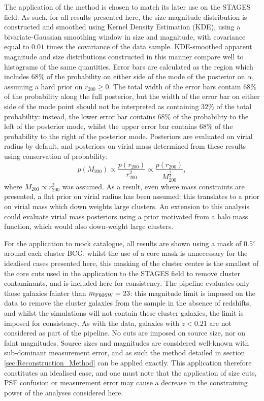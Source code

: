 \documentclass[useAMS,usenatbib,times,letter,amssymb]{mn2e}
\def\be{\begin{equation}}
\def\ee{\end{equation}}
\begin{document}
The application of the method is chosen to match its later use on the STAGES field. As such, for all results presented here, the size-magnitude distribution is constructed and smoothed using Kernel Density Estimation (KDE), using a bivariate-Gaussian smoothing window in size and magnitude, with covariance equal to $0.01$ times the covariance of the data sample. KDE-smoothed apparent magnitude and size distributions constructed in this manner compare well to histograms of the same quantities. Error bars are calculated as the region which includes $68\%$ of the probability on either side of the mode of the posterior on $\alpha$, assuming a hard prior on $r_{200} \ge 0$. The total width of the error bars contain $68\%$ of the probability along the full posterior, but the width of the error bar on either side of the mode point should not be interpreted as containing $32\%$ of the total probability: instead, the lower error bar contains $68\%$ of the probability to the left of the posterior mode, whilst the upper error bar contains $68\%$ of the probability to the right of the posterior mode. Posteriors are evaluated on virial radius by default, and posteriors on virial mass determined from these results using conservation of probability:
\be\label{eqn:Mass_Radius_Prior_equiv}
p(M_{200}) \propto \frac{p(r_{200})}{r_{200}^2} \propto \frac{p(r_{200})}{M_{200}^{\frac{2}{3}}},
\ee
where $M_{200} \propto r_{200}^3$ was assumed. As a result, even where mass constraints are presented, a flat prior on virial radius has been assumed: this translates to a prior on virial mass which down weights large clusters. An extension to this analysis could evaluate virial mass posteriors using a prior motivated from a halo mass function, which would also down-weight large clusters.

For the application to mock catalogue, all results are shown using a mask of $0.5'$ around each cluster BCG: whilst the use of a core mask is unnecessary for the idealised cases presented here, this masking of the cluster centre is the smallest of the core cuts used in the application to the STAGES field to remove cluster contaminants, and is included here for consistency. The pipeline evaluates only those galaxies fainter than $m_{\rm F606W} = 23$: this magnitude limit is imposed on the data to remove the cluster galaxies from the sample in the absence of redshifts, and whilst the simulations will not contain these cluster galaxies, the limit is imposed for consistency. As with the data, galaxies with $z < 0.21$ are not considered as part of the pipeline. No cuts are imposed on source size, nor on faint magnitudes. Source sizes and magnitudes are considered well-known with sub-dominant measurement error, and as such the method detailed in section \ref{sec:Reconstruction_Method} can be applied exactly.  This application therefore constitutes an idealised case, and one must note that the application of size cuts, PSF confusion or measurement error may cause a decrease in the constraining power of the analyses considered here. 
\end{document}
